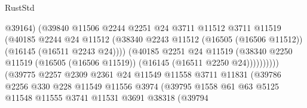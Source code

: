 \begin{lexlean}{RustStd}
\begin{coremodule}
                                          @39164)
                                        (@39840
                                          @11506
                                          @2244
                                          @2251
                                          @24
                                          @3711
                                          @11512
                                          @3711
                                          @11519
                                          (@40185
                                            @2244
                                            @24
                                            @11512
                                            (@38340
                                              @2243
                                              @11512
                                              (@16505 (@16506 @11512))
                                              (@16145 (@16511 @2243 @24))))
                                          (@40185
                                            @2251
                                            @24
                                            @11519
                                            (@38340
                                              @2250
                                              @11519
                                              (@16505 (@16506 @11519))
                                              (@16145 (@16511 @2250 @24))))))))))
                              (@39775
                                @2257
                                @2309
                                @2361
                                @24
                                @11549
                                @11558
                                @3711
                                @11831
                                (@39786
                                  @2256
                                  @330
                                  @228
                                  @11549
                                  @11556
                                  @3974
                                  (@39795
                                    @1558
                                    @61
                                    @63
                                    @5125
                                    @11548
                                    @11555
                                    @3741
                                    @11531
                                    @3691
                                    @38318
                                    (@39794

\end{coremodule}
\end{lexlean}

